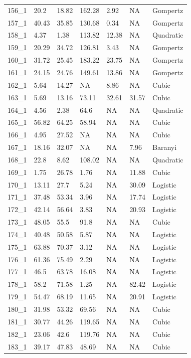\documentclass[titlepage]{article}
\begin{document}
\begin{longtable}{lllllll}
156\_1 & 20.2 & 18.82 & 162.28 & 2.92 & NA & Gompertz \\
157\_1 & 40.43 & 35.85 & 130.68 & 0.34 & NA & Gompertz \\
158\_1 & 4.37 & 1.38 & 113.82 & 12.38 & NA & Quadratic \\
159\_1 & 20.29 & 34.72 & 126.81 & 3.43 & NA & Gompertz \\
160\_1 & 31.72 & 25.45 & 183.22 & 23.75 & NA & Gompertz \\
161\_1 & 24.15 & 24.76 & 149.61 & 13.86 & NA & Gompertz \\
162\_1 & 5.64 & 14.27 & NA & 8.86 & NA & Cubic \\
163\_1 & 5.69 & 13.16 & 73.11 & 32.61 & 31.57 & Cubic \\
164\_1 & 4.56 & 2.38 & 64.6 & NA & NA & Quadratic \\
165\_1 & 56.82 & 64.25 & 58.94 & NA & NA & Cubic \\
166\_1 & 4.95 & 27.52 & NA & NA & NA & Cubic \\
167\_1 & 18.16 & 32.07 & NA & NA & 7.96 & Baranyi \\
168\_1 & 22.8 & 8.62 & 108.02 & NA & NA & Quadratic \\
169\_1 & 1.75 & 26.78 & 1.76 & NA & 11.88 & Cubic \\
170\_1 & 13.11 & 27.7 & 5.24 & NA & 30.09 & Logistic \\
171\_1 & 37.48 & 53.34 & 3.96 & NA & 17.74 & Logistic \\
172\_1 & 42.14 & 56.64 & 3.83 & NA & 20.93 & Logistic \\
173\_1 & 48.05 & 55.5 & 91.8 & NA & NA & Cubic \\
174\_1 & 40.48 & 50.58 & 5.87 & NA & NA & Logistic \\
175\_1 & 63.88 & 70.37 & 3.12 & NA & NA & Logistic \\
176\_1 & 61.36 & 75.49 & 2.29 & NA & NA & Logistic \\
177\_1 & 46.5 & 63.78 & 16.08 & NA & NA & Logistic \\
178\_1 & 58.2 & 71.58 & 1.25 & NA & 82.42 & Logistic \\
179\_1 & 54.47 & 68.19 & 11.65 & NA & 20.91 & Logistic \\
180\_1 & 31.98 & 53.32 & 69.56 & NA & NA & Cubic \\
181\_1 & 30.77 & 44.26 & 119.65 & NA & NA & Cubic \\
182\_1 & 23.06 & 42.6 & 119.76 & NA & NA & Cubic \\
183\_1 & 39.17 & 47.83 & 48.69 & NA & NA & Cubic \\

\end{longtable}
\end{document}
